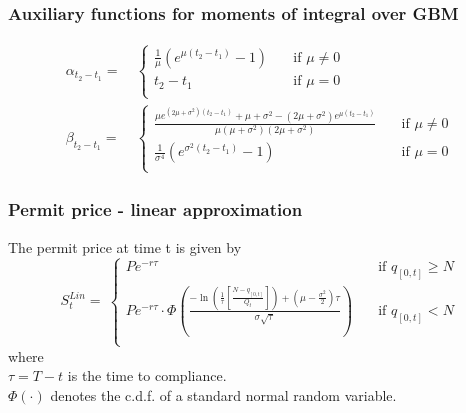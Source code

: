 \begin{frame}
  \frametitle{Auxiliary functions for moments of integral over GBM}
\begin{align}
\alpha_{t_2-t_1}    =& \ \left\{
         \begin{array}{ll}
            \frac{1}{\mu} \left( e^{\mu \left( t_2 - t_1 \right)} - 1 \right)
            & \quad \mbox{if $\mu \ne 0$} \\
            t_2 - t_1
            & \quad \mbox{if $\mu = 0$} \\
         \end{array} \right. \label{MomIntAlpha} \\
\beta_{t_2-t_1}    =& \ \left\{
         \begin{array}{ll}
            \frac{ \mu e^{(2 \mu + \sigma^2) \left( t_2 - t_1 \right)} + \mu + \sigma^2 - \left( 2\mu + \sigma^2\right) e^{\mu \left( t_2 - t_1 \right)}}{\mu(\mu + \sigma^2)(2\mu + \sigma^2)}
            & \quad \mbox{if $\mu \ne 0$} \\
            \frac{1}{\sigma^4} \left( e^{\sigma^2\left(t_2-t_1\right)} - 1\right)
            & \quad \mbox{if $\mu = 0$} \\
         \end{array} \right. \label{MomIntBeta}
\end{align}
\end{frame}

\begin{frame}
  \frametitle{Permit price - linear approximation}

    The permit price at time t is given by
  $$
  S_t^{Lin} = \ \left\{
         \begin{array}{ll}
            P e^{-r\tau}
            & \quad \mbox{if $q_{[0,t]} \ge N$} \\
            P e^{-r\tau} \cdot \Phi \left(\frac{-\ln\left( \frac{1}{\tau} \left[ \frac{N - q_{[0,t]}}{Q_t} \right] \right) + \left( \mu - \frac{\sigma^2}{2}\right)\tau}{\sigma \sqrt{\tau}} \right) & \quad \mbox{if $q_{[0,t]} < N$} \\
         \end{array} \right.
$$
where \\
$\tau = T - t$ is the time to compliance. \\
$\Phi(\cdot)$ denotes the c.d.f. of a standard normal random variable.

\end{frame}

